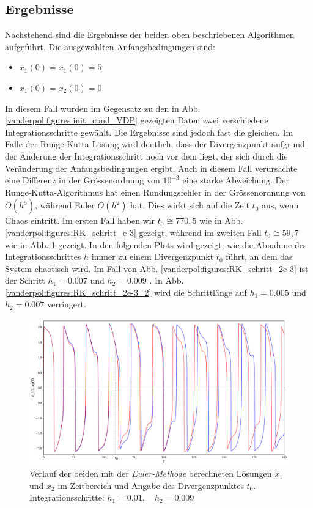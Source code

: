 \subsection{Ergebnisse
\label{vanderpol:section:ergebnisse}}
Nachstehend sind die Ergebnisse der beiden oben beschriebenen Algorithmen aufgeführt. Die ausgewählten Anfangsbedingungen sind:
\begin{itemize}
\item
$\dot{x_1}(0) = \dot{x_1}(0) = 5$
\item
$x_1(0) = x_2(0) = 0$
\end{itemize}
In diesem Fall wurden im Gegensatz zu den in Abb.\ref{vanderpol:figures:init_cond_VDP} gezeigten Daten zwei verschiedene Integrationsschritte gewählt. Die Ergebnisse sind jedoch fast die gleichen. Im Falle der Runge-Kutta Lösung wird deutlich, dass der Divergenzpunkt aufgrund der Änderung der Integrationsschritt noch vor dem liegt, der sich durch die Veränderung der Anfangsbedingungen ergibt. Auch in diesem Fall verursachte eine Differenz in der Grössenordnung von $10^{-3}$ eine starke Abweichung. Der Runge-Kutta-Algorithmus hat einen Rundungsfehler in der Grössenordnung von $O(h^5)$, während Euler $O(h^2)$ hat. Dies wirkt sich auf die Zeit $t_0$ aus, wenn Chaos eintritt. Im ersten Fall haben wir $t_0 \cong 770,5$ wie in Abb. \ref{vanderpol:figures:RK_schritt_e-3} gezeigt, während im zweiten Fall $t_0 \cong 59,7$ wie in Abb. \ref{vanderpol:figures:EULER_schritt} gezeigt.
In den folgenden Plots wird gezeigt, wie die Abnahme des Integrationsschrittes $h$ immer zu einem Divergenzpunkt $t_0$ führt, an dem das System chaotisch wird. Im Fall von Abb. \ref{vanderpol:figures:RK_schritt_2e-3} ist der Schritt $h_1=0.007$ und $h_2=0.009$ . In Abb. \ref{vanderpol:figures:RK_schritt_2e-3_2} wird die Schrittlänge auf $h_1=0.005$ und $h_2=0.007$ verringert. 

\begin{figure}
\includegraphics[width=\textwidth]{papers/vanderpol/figures/EULER_schritt_delta_e-3.pdf}
\caption{Verlauf der beiden mit der {\em Euler-Methode} berechneten Lösungen $x_1$ und $x_2$ im Zeitbereich und Angabe des Divergenzpunktes $t_0$. Integrationsschritte: $h_1 = 0.01, \quad h_2 = 0.009$\label{vanderpol:figures:EULER_schritt}}
\end{figure}

